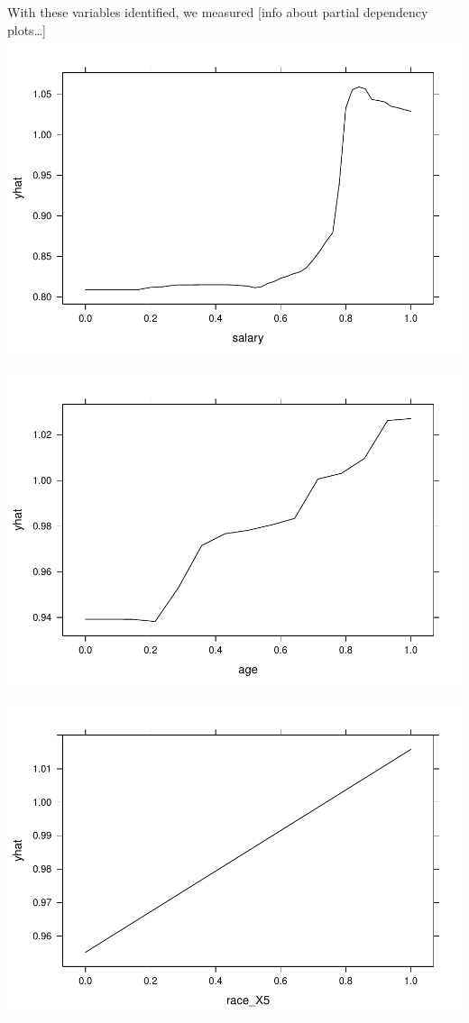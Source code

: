 \documentclass[]{article}
\begin{document}
With these variables identified, we measured {[}info about partial
dependency plots\ldots{}{]}
\includegraphics{Report_Draft_04282019_files/figure-latex/unnamed-chunk-30-1.pdf}

\includegraphics{Report_Draft_04282019_files/figure-latex/unnamed-chunk-31-1.pdf}

\includegraphics{Report_Draft_04282019_files/figure-latex/unnamed-chunk-32-1.pdf}
\end{document}
